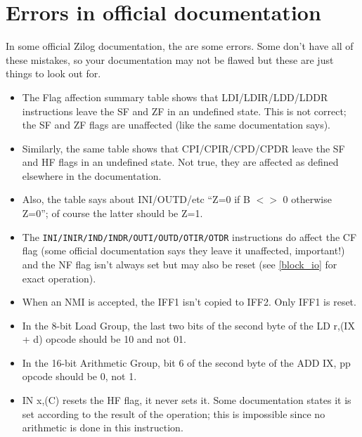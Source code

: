 \documentclass[oneside,a4paper]{book}
\begin{document}
\appendix




\chapter{Errors in official documentation}


In some official Zilog documentation, the are some errors. Some don't have all of these mistakes, so your documentation may not be flawed but these are just things to look out for.

\begin{itemize}

	\item
	The Flag affection summary table shows that {\ttfamily LDI/LDIR/LDD/LDDR} instructions leave the SF and ZF in an undefined state. This is not correct; the SF and ZF flags are unaffected (like the same documentation says).

	\item
	Similarly, the same table shows that {\ttfamily CPI/CPIR/CPD/CPDR} leave the SF and HF flags in an undefined state. Not true, they are affected as defined elsewhere in the documentation.

	\item
	Also, the table says about {\ttfamily INI/OUTD/}etc ``Z=0 if B $<>$ 0 otherwise Z=0''; of course the latter should be Z=1.

	\item
	The {\tt INI/INIR/IND/INDR/OUTI/OUTD/OTIR/OTDR} instructions do affect the CF flag (some official documentation says they leave it unaffected, important!) and the NF flag isn't always set but may also be reset (see \ref{block_io} for exact operation).

	\item
	When an NMI is accepted, the IFF1 isn't copied to IFF2. Only IFF1 is reset.

	\item
	In the 8-bit Load Group, the last two bits of the second byte of the {\ttfamily LD r,(IX + d)} opcode should be 10 and not 01.

	\item
	In the 16-bit Arithmetic Group, bit 6 of the second byte of the {\ttfamily ADD IX, pp} opcode should be 0, not 1.

	\item
	{\ttfamily IN x,(C)} resets the HF flag, it never sets it. Some documentation states it is set according to the result of the operation; this is impossible since no arithmetic is done in this instruction.

\end{itemize}
\end{document}
